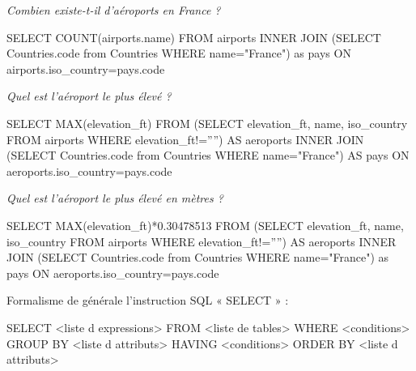 \documentclass[10pt]{article}
\begin{document}
\begin{exemple}
\textit{Combien existe-t-il d'aéroports en France ?}

\begin{envsql}
\begin{sql}
SELECT COUNT(airports.name) 
        FROM airports 
    INNER JOIN 
        (SELECT Countries.code from Countries WHERE name="France") as pays 
    ON airports.iso_country=pays.code
\end{sql}
\end{envsql}

\textit{Quel est l'aéroport le plus élevé ?}
\begin{envsql}
\begin{sql}
SELECT MAX(elevation_ft) FROM 
    (SELECT elevation_ft, name, iso_country FROM airports WHERE elevation_ft!='''') AS aeroports
    INNER JOIN 
    (SELECT Countries.code from Countries WHERE name="France") AS pays     
        ON aeroports.iso_country=pays.code
\end{sql}
\end{envsql}

\textit{Quel est l'aéroport le plus élevé en mètres ?}
\begin{envsql}
\begin{sql}
SELECT MAX(elevation_ft)*0.30478513 FROM 
    (SELECT elevation_ft, name, iso_country FROM airports WHERE elevation_ft!='''') AS aeroports 
    INNER JOIN 
    (SELECT Countries.code from Countries WHERE name="France") as pays 
        ON aeroports.iso_country=pays.code
\end{sql}
\end{envsql}

\end{exemple}


\begin{rem}
Formalisme de générale l’instruction SQL « SELECT » :
\begin{envsql}
\begin{sql}
SELECT <liste d expressions> 
    FROM <liste de tables> 
    WHERE <conditions> 
    GROUP BY <liste d attributs> 
    HAVING <conditions> 
    ORDER BY <liste d attributs> 
\end{sql}
\end{envsql}
\end{rem}

\begin{thebibliography}{2}
\end{thebibliography}
\end{document}
